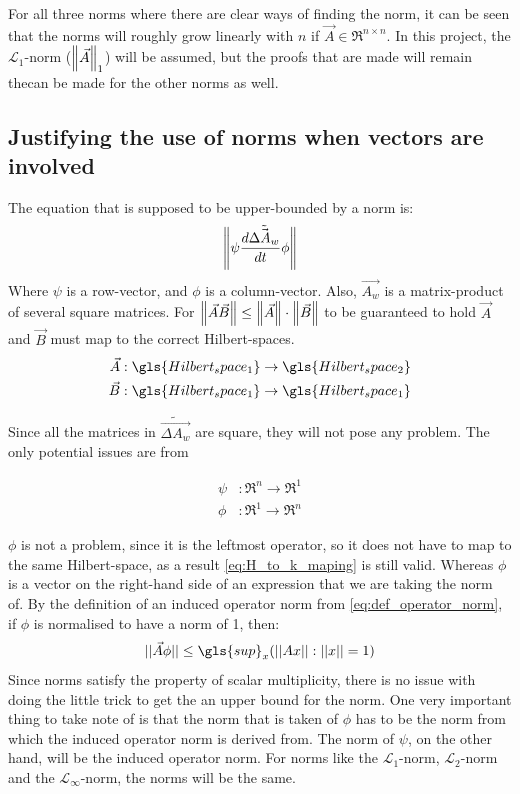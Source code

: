 For all three norms where there are clear ways of finding the norm, it can be seen that the norms will roughly grow linearly with $n$ if $\Vec{A} \in \Re^{ n \times n}$. In this project, the $\mathcal{L}_1$-norm  ($\left\lVert\Vec{A}\right\rVert_1$) will be assumed, but the proofs that are made will remain thecan be made for the other norms as well. 


\subsection{Justifying the use of norms when vectors are involved}
The equation that is supposed to be upper-bounded by a norm is: 
\begin{equation}
    \left\lVert\psi\frac{d \tilde{\Vec{\Delta A_w}}}{dt }\phi\right\rVert
\end{equation}
Where $\psi$ is a row-vector, and $\phi$ is a column-vector. Also, $\Vec{A_w}$ is a matrix-product of several square matrices. 
For $\left\lVert\Vec{A}\Vec{B}\right\rVert \leq \left\lVert\Vec{A}\right\rVert \cdot  \left\lVert\Vec{B}\right\rVert$ to be guaranteed to hold $\Vec{A}$ and $\Vec{B}$ must map to the correct Hilbert-spaces. 
\begin{align}
    \Vec{A} : \gls{Hilbert_space_1} \rightarrow \gls{Hilbert_space_2}\\
    \Vec{B} : \gls{Hilbert_space_1} \rightarrow \gls{Hilbert_space_1}
    \label{eq:H_to_k_maping}
\end{align}

Since all the matrices in $\tilde{\Vec{\Delta A_w}}$ are square, they will not pose any problem. The only potential issues are from 

\begin{align}
    \psi &: \Re^n \rightarrow \Re^1\\
    \phi &: \Re^1 \rightarrow \Re^n
\end{align}


$\phi$ is not a problem, since it is the leftmost operator, so it does not have to map to the same Hilbert-space, as a result \cref{eq:H_to_k_maping} is  still valid. Whereas $\phi$ is a vector on the right-hand side of an expression that we are taking the norm of. By the definition of an induced operator norm from \cref{eq:def_operator_norm}, if $\phi$ is normalised to have a norm of 1, then:
\begin{equation}
    ||\Vec{A}\phi|| \leq \gls{sup}_x(||Ax|| : ||x|| = 1)
\end{equation}
Since norms satisfy the property of scalar multiplicity, there is no issue with doing the little trick to get the an upper bound for the norm. 
\noindent
One very important thing to take note of is that the norm that is taken of $\phi$ has to be the norm from which the induced operator norm is derived from. The norm of $\psi$, on the other hand, will be the induced operator norm. For norms like the $\mathcal{L}_1$-norm, $\mathcal{L}_2$-norm and the $\mathcal{L}_\infty$-norm, the norms will be the same. 
